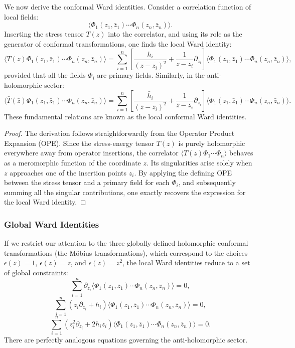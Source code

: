 We now derive the conformal Ward identities. Consider a correlation function of local fields:
\[
    \langle \Phi_1(z_1, \bar{z}_1) \cdots \Phi_n(z_n, \bar{z}_n) \rangle.
\]
Inserting the stress tensor \(T(z)\) into the correlator, and using its role as the generator of conformal transformations, one finds the local Ward identity:
\[
    \langle T(z) \Phi_1(z_1, \bar{z}_1) \cdots \Phi_n(z_n, \bar{z}_n) \rangle = \sum_{i=1}^n \left[ \frac{h_i}{(z - z_i)^2} + \frac{1}{z - z_i} \partial_{z_i} \right] \langle \Phi_1(z_1, \bar{z}_1) \cdots \Phi_n(z_n, \bar{z}_n) \rangle,
\]
provided that all the fields \(\Phi_i\) are primary fields.
Similarly, in the anti-holomorphic sector:
\[
    \langle \bar{T}(\bar{z}) \Phi_1(z_1, \bar{z}_1) \cdots \Phi_n(z_n, \bar{z}_n) \rangle = \sum_{i=1}^n \left[ \frac{\bar{h}_i}{(\bar{z} - \bar{z}_i)^2} + \frac{1}{\bar{z} - \bar{z}_i} \partial_{\bar{z}_i} \right] \langle \Phi_1(z_1, \bar{z}_1) \cdots \Phi_n(z_n, \bar{z}_n) \rangle.
\]
These fundamental relations are known as the local conformal Ward identities.

\begin{proof}
    The derivation follows straightforwardly from the Operator Product Expansion (OPE). Since the stress-energy tensor \(T(z)\) is purely holomorphic everywhere away from operator insertions, the correlator \(\langle T(z) \Phi_1 \cdots \Phi_n \rangle\) behaves as a meromorphic function of the coordinate \(z\). Its singularities arise solely when \(z\) approaches one of the insertion points \(z_i\). By applying the defining OPE between the stress tensor and a primary field for each \(\Phi_i\), and subsequently summing all the singular contributions, one exactly recovers the expression for the local Ward identity.
\end{proof}

\subsubsection{Global Ward Identities}

If we restrict our attention to the three globally defined holomorphic conformal transformations (the Möbius transformations), which correspond to the choices \(\epsilon(z) = 1\), \(\epsilon(z) = z\), and \(\epsilon(z) = z^2\), the local Ward identities reduce to a set of global constraints:
\[
    \sum_{i=1}^n \partial_{z_i} \langle \Phi_1(z_1, \bar{z}_1) \cdots \Phi_n(z_n, \bar{z}_n) \rangle = 0,
\]
\[
    \sum_{i=1}^n (z_i \partial_{z_i} + h_i) \langle \Phi_1(z_1, \bar{z}_1) \cdots \Phi_n(z_n, \bar{z}_n) \rangle = 0,
\]
\[
    \sum_{i=1}^n (z_i^2 \partial_{z_i} + 2 h_i z_i) \langle \Phi_1(z_1, \bar{z}_1) \cdots \Phi_n(z_n, \bar{z}_n) \rangle = 0.
\]
There are perfectly analogous equations governing the anti-holomorphic sector.


